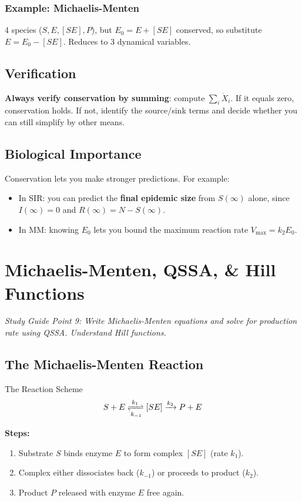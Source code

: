 \documentclass[11pt]{article}
\begin{document}
\subsubsection{Example: Michaelis-Menten}
4 species ($S, E, [SE], P$), but $E_0 = E + [SE]$ conserved, so substitute $E = E_0 - [SE]$. Reduces to 3 dynamical variables.

\subsection{Verification}

\begin{tipbox}
\textbf{Always verify conservation by summing}: compute $\sum_i \dot X_i$. If it equals zero, conservation holds. If not, identify the source/sink terms and decide whether you can still simplify by other means.
\end{tipbox}

\subsection{Biological Importance}

Conservation lets you make stronger predictions. For example:
\begin{itemize}
\item In SIR: you can predict the \textbf{final epidemic size} from $S(\infty)$ alone, since $I(\infty) = 0$ and $R(\infty) = N - S(\infty)$.
\item In MM: knowing $E_0$ lets you bound the maximum reaction rate $V_{\max} = k_2 E_0$.
\end{itemize}

\section{Michaelis-Menten, QSSA, \& Hill Functions}

\textit{Study Guide Point 9: Write Michaelis-Menten equations and solve for production rate using QSSA. Understand Hill functions.}

\subsection{The Michaelis-Menten Reaction}

\begin{conceptbox}{The Reaction Scheme}
\[
S + E \xrightleftharpoons[k_{-1}]{k_1} [SE] \xrightarrow{k_2} P + E
\]

\textbf{Steps:}
\begin{enumerate}
\item Substrate $S$ binds enzyme $E$ to form complex $[SE]$ (rate $k_1$).
\item Complex either dissociates back ($k_{-1}$) or proceeds to product ($k_2$).
\item Product $P$ released with enzyme $E$ free again.
\end{enumerate}
\end{conceptbox}
\end{document}
